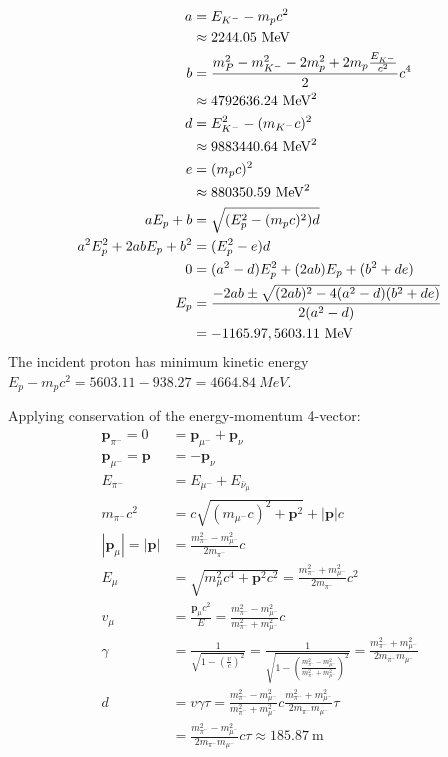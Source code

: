 \documentclass{article}
\begin{document}
\begin{equation}
    \begin{split}
        a & = E_{K^-} - m_pc^2 \\
        & \approx 2244.05~\unit{MeV} \\
        b & = \frac{m_{P}^2 - m_{K^-}^2 - 2m_p^2 + 2m_p\frac{E_{K^-}}{c^2}}{2}c^4 \\
        & \approx 4792636.24~\unit{MeV\squared} \\
        d & = E_{K^-}^2 - (m_{K^-}c)^2 \\
        & \approx 9883440.64~\unit{MeV\squared} \\
        e & = (m_pc)^2 \\
        & \approx 880350.59~\unit{MeV\squared} \\
        aE_p + b & = \sqrt{(E_p^2 - (m_pc)^2)d} \\
        a^2E_p^2 + 2abE_p + b^2 & = (E_p^2 - e)d \\
        0 & = (a^2 - d)E_p^2 + (2ab)E_p + (b^2 + de) \\
        E_p & = \frac{-2ab \pm \sqrt{(2ab)^2 - 4(a^2 - d)(b^2 + de)}}{2(a^2 - d)} \\
        & = -1165.97, 5603.11~\unit{MeV}
    \end{split}
\end{equation}
The incident proton has minimum kinetic energy $E_p - m_pc^2 = 5603.11 - 938.27 = 4664.84~\unit{MeV}$.
\clearpage

Applying conservation of the energy-momentum 4-vector:
\begin{equation}
    \begin{split}
        \mathbf{p}_{\pi^-} = 0 & = \mathbf{p}_{\mu^-} + \mathbf{p}_{\nu} \\
        \mathbf{p}_{\mu^-} = \mathbf{p} & = -\mathbf{p}_{\nu} \\
        E_{\pi^-} & = E_{\mu^-} + E_{\bar{\nu}_\mu} \\
        m_{\pi^-}c^2 & = c\sqrt{(m_{\mu^-}c)^2 + \mathbf{p}^2} + |\mathbf{p}|c \\
        |\mathbf{p}_\mu| = |\mathbf{p}| & = \frac{m_{\pi^-}^2 - m_{\mu^-}^2}{2m_{\pi^-}}c \\
        E_\mu & = \sqrt{m_{\mu}^2c^4 + \mathbf{p}^2c^2} = \frac{m_{\pi^-}^2 + m_{\mu^-}^2}{2m_{\pi^-}}c^2 \\
        v_\mu & = \frac{\mathbf{p}_{\mu}c^2}{E} = \frac{m_{\pi^-}^2 - m_{\mu^-}^2}{m_{\pi^-}^2 + m_{\mu^-}^2}c \\
        \gamma & = \frac{1}{\sqrt{1 - (\frac{v}{c})^2}} = \frac{1}{\sqrt{1 - (\frac{m_{\pi^-}^2 - m_{\mu^-}^2}{m_{\pi^-}^2 + m_{\mu^-}^2})^2}} = \frac{m_{\pi^-}^2 + m_{\mu^-}^2}{2m_{\pi^-}m_{\mu^-}} \\
        d & = v\gamma\tau = \frac{m_{\pi^-}^2 - m_{\mu^-}^2}{m_{\pi^-}^2 + m_{\mu^-}^2}c\frac{m_{\pi^-}^2 + m_{\mu^-}^2}{2m_{\pi^-}m_{\mu^-}}\tau \\
        & = \frac{m_{\pi^-}^2 - m_{\mu^-}^2}{2m_{\pi^-}m_{\mu^-}}c\tau \approx 185.87~\unit{\meter}
    \end{split}
\end{equation}
\clearpage
\end{document}
